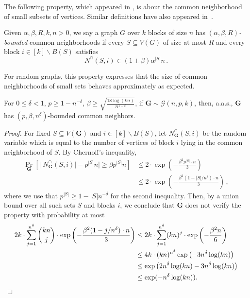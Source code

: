 \documentclass[10pt,a4paper]{article}
\makeatletter
\theoremstyle{definition}
\theoremstyle{remark}
\theoremstyle{example}
\theoremstyle{plain}
\renewcommand{\setminus}{\smallsetminus}
\newcommand{\calG}{\mathcal{G}}
\newcommand{\random}[1]{\bm{#1}}
\newcommand{\CNbound}{R}
\newcommand{\aas}{a.a.s.\@\xspace}
\makeatother
\begin{document}
The following property, which appeared in \cite{dRPR23UnarySA}, is about the common neighborhood of small subsets of vertices. Similar definitions have also appeared in~\cite{BIS07IndependentSets, BGL13ParameterizedDPLL, ABdRLNR21Clique}.
\begin{definition}\label{def:common-neighbor}
    Given $\alpha,\beta,R, k,n > 0$, 
    we say a graph $G$ over $k$ blocks of size $n$ has \emph{$(\alpha,\beta,\CNbound)$-bounded} common neighborhoods if every $S\subseteq V(G)$ of size at most $\CNbound$ and every block $i \in [k]\setminus B(S)$ satisfies
    $$N^\cap(S,i)\in (1\pm \beta)\alpha^{|S|}n\,.$$
\end{definition}

For random graphs, this property expresses that the size of common neighborhoods of small sets behaves approximately as expected.

\begin{lemma}
    \label{lemma:neigbor-concentrates}
    For $0\leq\delta <1$, $p\geq 1- n^{-\delta}$, $\beta \geq \sqrt{\frac{18\log(kn)}{n^{1-\delta}}}$, if $\random{G} \sim  \calG(n,p,k)$, then, \aas, $\random{G}$ has $(p,\beta,n^\delta)$-bounded common neighbors.
\end{lemma}

{}{
\begin{proof}
For fixed 
$S \subseteq  V(\random{G})$
and $i \in [k]\setminus B(S)$, let $N_{\random{G}}^\cap(S,i)$ be the random variable which is equal to the number of vertices of block $i$ lying in the common neighborhood of $S$. By Chernoff's inequality,
\begin{align*}
    \Pr_{\random{G}}[\big\lvert\lvert {N_{\random{G}}^\cap(S,i)}\rvert - p^{|S|}n\big \rvert \geq \beta p^{|S|}n]
    &\leq 2\cdot \exp\left ( -\frac{\beta^2p^{|S|} \cdot n}{3}\right)\\
    & \leq 2\cdot \exp\left ( -\frac{\beta^2(1-|S|/n^\delta) \cdot n}{3}\right)\,,
\end{align*}
where we use that $p^{|S|} \geq 1-|S|n^{-\delta}$ for the second inequality. Then, by a union bound over all such sets $S$ and blocks $i$, we conclude that $\random{G}$ does not verify the property with probability at most
\begin{align*}
    2k\cdot \sum_{j=1}^{n^\delta} 
    \binom{kn}{j}\cdot 
    \exp\left ( 
    -\frac{\beta^2(1-j/n^\delta) \cdot n}{3}
    \right) &\leq 2k\cdot \sum_{j=1}^{n^\delta} (kn)^j\cdot 
    \exp\left ( -\frac{\beta^2 n}{6}\right)\\
    & \leq 4k \cdot (kn)^{n^\delta}
    \exp\left( -3n^{\delta} \log (kn) \right) \\
    & \leq 
    \exp\left( 2n^{\delta} \log (kn)-3n^{\delta} \log (kn) \right) \\
    &\leq \exp(-n^{\delta} \log (kn)) . \qedhere
\end{align*}
\end{proof}
}
\end{document}
